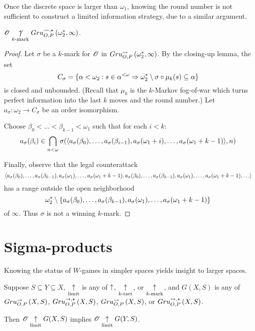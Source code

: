 Once the discrete space is larger than $\omega_1$, knowing the round number
is not sufficient to construct a limited information strategy, due to a
similar argument.

\begin{thm}
  $\mathscr{O}\underset{k\text{-mark}}{\not\uparrow}Gru_{O,P}^{\leadsto,\star}\left({\omega^*_2},{\infty}\right)$.
\end{thm}

\begin{proof}
  Let $\sigma$ be a $k$-mark for $\mathscr{O}$ in
  $Gru_{O,P}^{\leadsto}\left({\omega^*_2},{\infty}\right)$. By the closing-up lemma, the set
    \[
      C_\sigma
        =
      \{
        \alpha<\omega_2
          :
        s\in\alpha^{<\omega}
          \Rightarrow
        \omega^*_2\setminus\sigma\circ\mu_k(s)
        \subseteq \alpha
      \}
    \]
  is closed and unbounded. (Recall that $\mu_k$ is the
  $k$-Markov fog-of-war which turns perfect information into the last $k$
  moves and the round number.) Let $a_\sigma:\omega_2\to C_\sigma$ be
  an order isomorphism.

  Choose $\beta_0<\dots<\beta_{k-1}<\omega_1$ such that for each $i<k$:
    \[
      a_\sigma(\beta_i)
        \in
      \bigcap_{n<\omega}
      \sigma(
        \langle a_\sigma(\beta_0),\dots,a_\sigma(\beta_{i-1}),
          a_\sigma(\omega_1+i),\dots,a_\sigma(\omega_1+k-1)\rangle,
      n)
    \]

  Finally, observe that the legal counterattack
    \[
      \<a_\sigma(\beta_0),\dots,a_\sigma(\beta_{k-1}),
        a_\sigma(\omega_1),\dots,a_\sigma(\omega_1+k-1),
        a_\sigma(\beta_0),\dots,a_\sigma(\beta_{k-1}),
        a_\sigma(\omega_1),\dots,a_\sigma(\omega_1+k-1),
        \dots\>
    \]
  has a range outside the open neighborhood %
    \[
      \omega^*_2
        \setminus
      \{a_\sigma(\beta_0),\dots,a_\sigma(\beta_{k-1}),
        a_\sigma(\omega_1),\dots,a_\sigma(\omega_1+k-1)\}
    \]
  of $\infty$. Thus $\sigma$ is not a winning $k$-mark.
\end{proof}



\section{Sigma-products}

Knowing the status of $W$-games in simpler spaces yields insight to larger
spaces.

\begin{prop}
  Suppose $S\subseteq Y\subseteq X$, $\underset{\text{limit}}{\uparrow}$ is any of $\uparrow$,
  $\underset{k\text{-tact}}{\uparrow}$, or $\underset{k\text{-mark}}{\uparrow}$, and $G(X,S)$ is any of $Gru_{O,P}^{\to}\left({X},{S}\right)$,
  $Gru_{O,P}^{\to,\star}\left({X},{S}\right)$, $Gru_{O,P}^{\leadsto}\left({X},{S}\right)$, or $Gru_{O,P}^{\leadsto,\star}\left({X},{S}\right)$.

  Then $\mathscr{O} \underset{\text{limit}}{\uparrow} G(X,S)$ implies $\mathscr{O} \underset{\text{limit}}{\uparrow} G(Y,S)$.
\end{prop}

